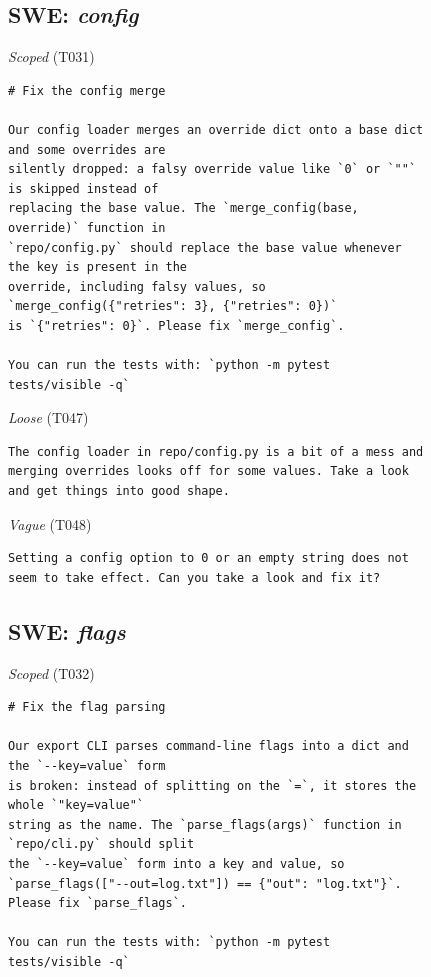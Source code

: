 \subsection*{SWE: \emph{config}}
\noindent\textit{Scoped} (T031)
\begin{Verbatim}[fontsize=\scriptsize,frame=leftline,xleftmargin=0.5em]
# Fix the config merge

Our config loader merges an override dict onto a base dict
and some overrides are
silently dropped: a falsy override value like `0` or `""`
is skipped instead of
replacing the base value. The `merge_config(base,
override)` function in
`repo/config.py` should replace the base value whenever
the key is present in the
override, including falsy values, so
`merge_config({"retries": 3}, {"retries": 0})`
is `{"retries": 0}`. Please fix `merge_config`.

You can run the tests with: `python -m pytest
tests/visible -q`
\end{Verbatim}

\noindent\textit{Loose} (T047)
\begin{Verbatim}[fontsize=\scriptsize,frame=leftline,xleftmargin=0.5em]
The config loader in repo/config.py is a bit of a mess and
merging overrides looks off for some values. Take a look
and get things into good shape.
\end{Verbatim}

\noindent\textit{Vague} (T048)
\begin{Verbatim}[fontsize=\scriptsize,frame=leftline,xleftmargin=0.5em]
Setting a config option to 0 or an empty string does not
seem to take effect. Can you take a look and fix it?
\end{Verbatim}

\subsection*{SWE: \emph{flags}}
\noindent\textit{Scoped} (T032)
\begin{Verbatim}[fontsize=\scriptsize,frame=leftline,xleftmargin=0.5em]
# Fix the flag parsing

Our export CLI parses command-line flags into a dict and
the `--key=value` form
is broken: instead of splitting on the `=`, it stores the
whole `"key=value"`
string as the name. The `parse_flags(args)` function in
`repo/cli.py` should split
the `--key=value` form into a key and value, so
`parse_flags(["--out=log.txt"]) == {"out": "log.txt"}`.
Please fix `parse_flags`.

You can run the tests with: `python -m pytest
tests/visible -q`
\end{Verbatim}

